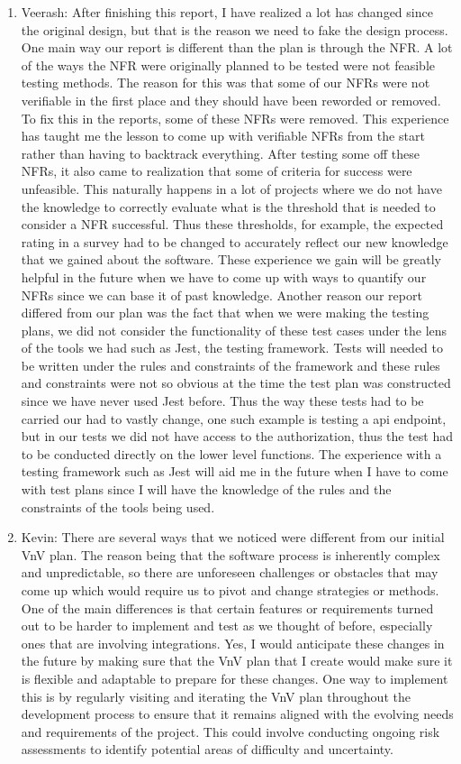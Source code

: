\documentclass[12pt, titlepage]{article}
\begin{document}
\begin{enumerate}
		\item Veerash: After finishing this report, I have realized a lot has changed since the original design, but that is the reason we need to fake the design process. One main way our report is different than the plan is through the NFR. A lot of the ways the NFR were originally planned to be tested were not feasible testing methods. The reason for this was that some of our NFRs were not verifiable in the first place and they should have been reworded or removed. To fix this in the reports, some of these NFRs were removed. This experience has taught me the lesson to come up with verifiable NFRs from the start rather than having to backtrack everything. After testing some off these NFRs, it also came to realization that some of criteria for success were unfeasible. This naturally happens in a lot of projects where we do not have the knowledge to correctly evaluate what is the threshold that is needed to consider a NFR successful. Thus these thresholds, for example, the expected rating in a survey had to be changed to accurately reflect our new knowledge that we gained about the software. These experience we gain will be greatly helpful in the future when we have to come up with ways to quantify our NFRs since we can base it of past knowledge. Another reason our report differed from our plan was the fact that when we were making the testing plans, we did not consider the functionality of these test cases under the lens of the tools we had such as Jest, the testing framework. Tests will needed to be written under the rules and constraints of the framework and these rules and constraints were not so obvious at the time the test plan was constructed since we have never used Jest before. Thus the way these tests had to be carried our had to vastly change, one such example is testing a api endpoint, but in our tests we did not have access to the authorization, thus the test had to be conducted directly on the lower level functions. The experience with a testing framework such as Jest will aid me in the future when I have to come with test plans since I will have the knowledge of the rules and the constraints of the tools being used.
		\item Kevin: There are several ways that we noticed were different from our initial VnV plan. The reason being that the software process is inherently complex and unpredictable, so there are unforeseen challenges or obstacles that may come up which would require us to pivot and change strategies or methods. One of the main differences is that certain features or requirements turned out to be harder to implement and test as we thought of before, especially ones that are involving integrations. Yes, I would anticipate these changes in the future by making sure that the VnV plan that I create would make sure it is flexible and adaptable to prepare for these changes. One way to implement this is by regularly visiting and iterating the VnV plan throughout the development process to ensure that it remains aligned with the evolving needs and requirements of the project. This could involve conducting ongoing risk assessments to identify potential areas of difficulty and uncertainty.  
		
	\end{enumerate}
	
\end{document}
